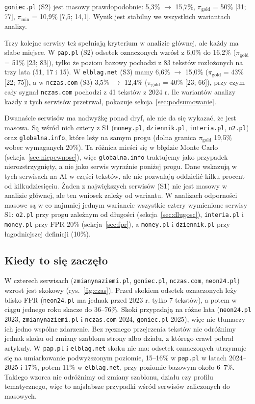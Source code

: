 \documentclass[11pt,a4paper]{article}
\newcommand{\pimin}{\ensuremath{\pi_{\mathrm{min}}}}
\newcommand{\pigold}{\ensuremath{\pi_{\mathrm{gold}}}}
\newcommand{\dom}[1]{\texttt{#1}}
\begin{document}
\dom{goniec.pl} (S2) jest masowy prawdopodobnie: 5,3\% $\rightarrow$ 15,7\%, \pigold{} = 50\% [31; 77], \pimin{} = 10,9\% [7,5; 14,1]. Wynik jest stabilny we wszystkich wariantach analizy.

Trzy kolejne serwisy też spełniają kryterium w analizie głównej, ale każdy ma słabe miejsce. W \dom{pap.pl} (S2) odsetek oznaczonych wzrósł z 6,0\% do 16,2\% (\pigold{} = 51\% [23; 83]), tylko że poziom bazowy pochodzi z 83 tekstów rozłożonych na trzy lata (51, 17 i 15). W \dom{elblag.net} (S3) mamy 6,6\% $\rightarrow$ 15,0\% (\pigold{} = 43\% [22; 75]), a w \dom{nczas.com} (S3) 3,5\% $\rightarrow$ 12,4\% (\pigold{} = 40\% [23; 66]), przy czym cały sygnał \dom{nczas.com} pochodzi z 41 tekstów z 2024 r. Ile wariantów analizy każdy z tych serwisów przetrwał, pokazuje sekcja~\ref{sec:podsumowanie}.

Dwanaście serwisów ma nadwyżkę ponad dryf, ale nie da się wykazać, że jest masowa. Są wśród nich cztery z S1 (\dom{money.pl}, \dom{dziennik.pl}, \dom{interia.pl}, \dom{o2.pl}) oraz \dom{globalna.info}, które leży na samym progu (dolna granica \pigold{} 19,5\% wobec wymaganych 20\%). Ta różnica mieści się w błędzie Monte Carlo (sekcja~\ref{sec:niepewnosc}), więc \dom{globalna.info} traktujemy jako przypadek nierozstrzygnięty, a nie jako serwis wyraźnie poniżej progu. Dane wskazują w tych serwisach na AI w części tekstów, ale nie pozwalają oddzielić kilku procent od kilkudziesięciu. Żaden z największych serwisów (S1) nie jest masowy w analizie głównej, ale ten wniosek zależy od wariantu. W analizach odporności masowe są w co najmniej jednym wariancie wszystkie cztery wymienione serwisy S1: \dom{o2.pl} przy progu zależnym od długości (sekcja~\ref{sec:dlugosc}), \dom{interia.pl} i \dom{money.pl} przy FPR 20\% (sekcja~\ref{sec:fpr}), a \dom{money.pl} i \dom{dziennik.pl} przy łagodniejszej definicji (10\%).

\subsection{Kiedy to się zaczęło}

W czterech serwisach (\dom{zmianynaziemi.pl}, \dom{goniec.pl}, \dom{nczas.com}, \dom{neon24.pl}) wzrost jest skokowy (rys.~\ref{fig:czas}). Przed skokiem odsetek oznaczonych leży blisko FPR (\dom{neon24.pl} ma jednak przed 2023 r. tylko 7 tekstów), a potem w ciągu jednego roku skacze do 36--76\%. Skoki przypadają na różne lata (\dom{neon24.pl} 2023, \dom{zmianynaziemi.pl} i \dom{nczas.com} 2024, \dom{goniec.pl} 2025), więc nie tłumaczy ich jedno wspólne zdarzenie. Bez ręcznego przejrzenia tekstów nie odróżnimy jednak skoku od zmiany szablonu strony albo działu, z którego crawl pobrał artykuły. W \dom{pap.pl} i \dom{elblag.net} skoku nie ma: odsetek oznaczonych utrzymuje się na umiarkowanie podwyższonym poziomie, 15--16\% w \dom{pap.pl} w latach 2024--2025 i 17\%, potem 11\% w \dom{elblag.net}, przy poziomie bazowym około 6--7\%. Takiego wzorca nie odróżnimy od zmiany szablonu, działu czy profilu tematycznego, więc to najsłabsze przypadki wśród serwisów zaliczonych do masowych.
\end{document}
